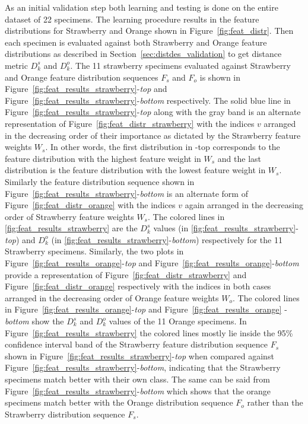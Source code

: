 \documentclass {udthesis}
\begin{document}
As an initial validation step both learning and testing is done on the entire dataset of 22 specimens. The learning procedure
results in the feature distributions for Strawberry and Orange shown in Figure~\ref{fig:feat_distr}. Then each specimen is evaluated against both Strawberry and Orange feature distributions as described in Section~\ref{sec:distdes_validation} to get distance metric $D^s_k$ and $D^o_k$. The 11 strawberry specimens evaluated against Strawberry and Orange feature distribution sequences $F_{s}$ and $F_{o}$ is shown in Figure~\ref{fig:feat_results_strawberry}-\textit{top} and Figure~\ref{fig:feat_results_strawberry}-\textit{bottom} respectively. The solid blue line in Figure~\ref{fig:feat_results_strawberry}-\textit{top} along with the gray band is an alternate representation of Figure~\ref{fig:feat_distr_strawberry} with the indices $v$ arranged in the decreasing order of their importance as dictated by the Strawberry feature weights $W_s$. In other words, the first distribution in -top corresponds to the feature distribution with the highest feature weight in $W_{s}$ and the 
last distribution is the 
feature distribution with the lowest feature weight in $W_{s}$. Similarly the feature distribution sequence shown in Figure~\ref{fig:feat_results_strawberry}-\textit{bottom} is an alternate form of  Figure~\ref{fig:feat_distr_orange} with the indices $v$ again arranged in the decreasing order of Strawberry feature weights $W_s$. The colored lines in \ref{fig:feat_results_strawberry} are the $D^s_k$ values (in \ref{fig:feat_results_strawberry}-\textit{top}) and $D^o_k$ (in \ref{fig:feat_results_strawberry}-\textit{bottom}) respectively for the 11 Strawberry specimens. Similarly, the two plots in Figure~\ref{fig:feat_results_orange}-\textit{top} and Figure~\ref{fig:feat_results_orange}-\textit{bottom} provide a representation of Figure~\ref{fig:feat_distr_strawberry} and Figure~\ref{fig:feat_distr_orange} respectively with the indices in both cases arranged in the decreasing order of Orange feature weights $W_o$. The colored lines in Figure~\ref{fig:feat_results_orange}-\textit{top} and Figure~\ref{fig:feat_results_orange}
-\textit{bottom} show the $D^s_k$ and $D^o_k$ values of the 11 Orange specimens. In Figure~\ref{fig:feat_results_strawberry} the colored lines mostly lie inside the 95\% confidence interval band of the Strawberry feature distribution sequence $F_s$ shown in Figure~\ref{fig:feat_results_strawberry}-\textit{top} when compared against Figure~\ref{fig:feat_results_strawberry}-\textit{bottom}, indicating that the Strawberry specimens match better with their own class. The same can be said from Figure~\ref{fig:feat_results_strawberry}-\textit{bottom} which shows that the orange specimens match better with the Orange distribution sequence $F_o$ rather than the Strawberry distribution sequence $F_s$.
\end{document}
